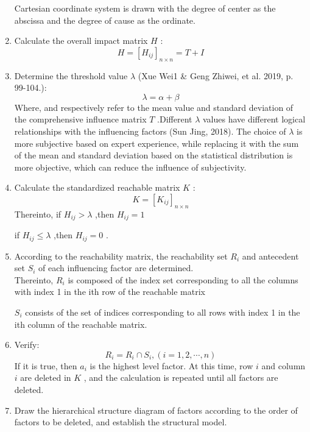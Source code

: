 \documentclass[12pt]{article}  %
\begin{document}
\begin{enumerate}
Cartesian coordinate system is drawn with the degree of center as the abscissa and the degree of 
cause as the ordinate.
    \item  Calculate the overall impact matrix $H$ :
    \begin{equation}
        H=[H_{ij}]_{n\times n}=T+I
    \end{equation}
    \item Determine the threshold value $\lambda$ (Xue Wei1 \& Geng Zhiwei, et al. 2019, p. 99-104.):
\begin{equation}
    \lambda =\alpha +\beta
\end{equation}
Where, and respectively refer to the mean value and standard deviation of the comprehensive 
influence matrix $T$ .Different $\lambda$ values have different logical relationships with the 
influencing factors (Sun Jing, 2018). The choice of $\lambda$ is more subjective based on expert 
experience, while replacing it with the sum of the mean and standard deviation based on the 
statistical distribution is more objective, which can reduce the influence of subjectivity.
    \item Calculate the standardized reachable matrix $K$ :
\begin{equation}
    K=[K_{ij}]_{n\times n}
\end{equation}
Thereinto, if $H_{ij}>\lambda$ ,then $H_{ij}=1$ 

\hspace{4.5em} if $H_{ij}\le \lambda$ ,then $H_{ij}=0$ .
\item  According to the reachability matrix, the reachability set $R_i$ and antecedent set $S_i$ of each 
influencing factor are determined.\\ 
Thereinto, $R_i$ is composed of the index set corresponding to all the 
columns with index 1 in the ith row of the reachable matrix

\hspace{4.5em} $S_i$ consists of the set of indices 
corresponding to all rows with index 1 in the ith column of the reachable matrix.
\item Verify:
\begin{equation}
    R_i=R_i\cap S_i,(i=1,2,\cdots ,n)
\end{equation}
If it is true, then $a_i$ is the highest level factor. At this time, row $i$ and column $i$ are deleted in $K$ , 
and the calculation is repeated until all factors are deleted.
\item Draw the hierarchical structure diagram of factors according to the order of factors to be 
deleted, and establish the structural model.
\end{enumerate}
\end{document}
